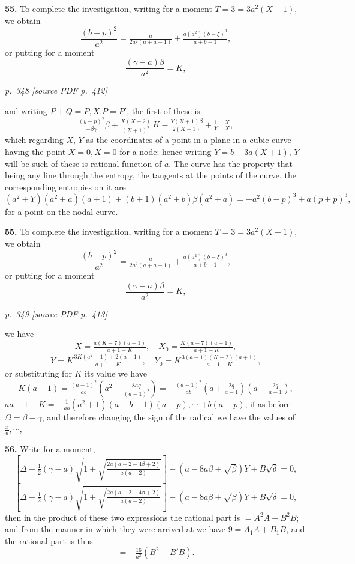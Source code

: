 \documentclass[11pt,a4paper]{article}
\newcommand{\pagemarker}[2]{\par\bigskip\noindent\textit{p.~#1 [source PDF p.~#2]}\par\smallskip}
\begin{document}
\textbf{55.} To complete the investigation, writing for a moment $T = 3 = 3a^2(X + 1)$, we obtain
\[
\frac{(b - p)^2}{a^2} = \tfrac{a}{2a^2(a + a - 1)} + \tfrac{a(a^2)(b - \xi)^3}{a + b - 1},
\]
or putting for a moment
\[
\frac{(\gamma - a)\beta}{a^2} = K,
\]

\clearpage

\bigskip
\pagemarker{348}{412}
\smallskip

and writing $P + Q = P, X. P = P'$, the first of these is
\[
\tfrac{(y - p)^2}{-\beta\gamma}\beta + \tfrac{X(X + 2)}{(X + 1)^2}\,K - \tfrac{Y(X + 1)\beta}{2(X + 1)} + \tfrac{1 - X}{Y + X},
\]
which regarding $X$, $Y$ as the coordinates of a point in a plane in a cubic curve having the point $X = 0, X = 0$ for a node: hence writing $Y = b + 3a(X + 1)$, $Y$ will be such of these is rational function of $a$. The curve has the property that being any line through the entropy, the tangents at the points of the curve, the corresponding entropies on it are
\[
(a^2 + Y)(a^2 + a)(a + 1) + (b + 1)(a^2 + b)\beta(a^2 + a) = -a^2(b - p)^3 + a(p + p)^3,
\]
for a point on the nodal curve.

\textbf{55.} To complete the investigation, writing for a moment $T = 3 = 3a^2(X + 1)$, we obtain
\[
\frac{(b - p)^2}{a^2} = \tfrac{a}{2a^2(a + a - 1)} + \tfrac{a(a^2)(b - \xi)^3}{a + b - 1},
\]
or putting for a moment
\[
\frac{(\gamma - a)\beta}{a^2} = K,
\]

\clearpage

\bigskip
\pagemarker{349}{413}
\smallskip

we have
\[
X = \tfrac{a(K - 7)(a - 1)}{a + 1 - K},\quad X_0 = \tfrac{K(a - 7)(a + 1)}{a + 1 - K},
\]
\[
Y = K \tfrac{3K(a^2 - 1) + 2(a + 1)}{a + 1 - K},\quad Y_0 = K \tfrac{3(a - 1)(K - 2)(a + 1)}{a + 1 - K},
\]
or substituting for $K$ its value we have
\[
K(a - 1) = \tfrac{(a - 1)^2}{ab}\!\left(a^2 - \tfrac{8aq}{(a - 1)^2}\right) = -\tfrac{(a - 1)^2}{ab}\!\left(a + \tfrac{2q}{a - 1}\right)\!\left(a - \tfrac{2q}{a - 1}\right),
\]
$a a + 1 - K = -\tfrac{1}{ab}(a^2 + 1)\!\left(a + b - 1\right)(a - p), \cdots$
$+ b\!(a - p)$,
if as before $\Omega = \beta - \gamma$, and therefore changing the sign of the radical we have the values of $\tfrac{x}{a}, \cdots$,

\textbf{56.} Write for a moment,
\[
\left[\Delta - \tfrac{1}{2}(\gamma - a)\sqrt{1 + \sqrt{\tfrac{2a(a - 2 - 4\beta + 2)}{a(a - 2)}}}\right] - (a - 8a\beta + \sqrt{\beta})Y + B\sqrt{\delta} = 0,
\]
\[
\left[\Delta - \tfrac{1}{2}(\gamma - a)\sqrt{1 + \sqrt{\tfrac{2a(a - 2 - 4\beta + 2)}{a(a - 2)}}}\right] - (a - 8a\beta + \sqrt{\beta})Y + B\sqrt{\delta} = 0,
\]
then in the product of these two expressions the rational part is $= A^2A + B^2B$; and from the manner in which they were arrived at we have $9 = A_1A + B_1B$, and the rational part is thus
\[
= -\tfrac{16}{a^2}(B^2 - B'B).
\]
\end{document}
